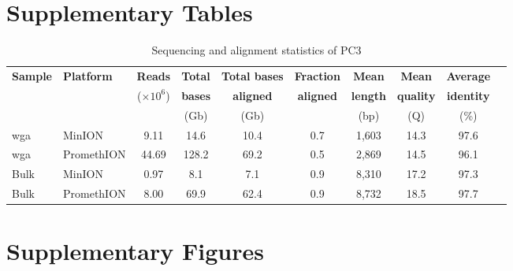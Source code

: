 \documentclass[pdflatex]{sn-jnl}%
\begin{document}
\clearpage

\section*{Supplementary Tables}

\begin{table}[!ht]
	\centering
	\caption{Sequencing and alignment statistics of PC3}
	\label{tab:seq_stats}
	\small
	\setlength{\tabcolsep}{3pt} %
	\begin{tabular}{@{}llcccccccc@{}}
		\toprule
		\textbf{Sample} & \textbf{Platform} & \textbf{Reads}  & \textbf{Total} & \textbf{Total bases} & \textbf{Fraction} & \textbf{Mean}   & \textbf{Mean}    & \textbf{Average}  \\
		                &                   & ($\times 10^6$) & \textbf{bases} & \textbf{aligned}     & \textbf{aligned}  & \textbf{length} & \textbf{quality} & \textbf{identity} \\
		                &                   &                 & (Gb)           & (Gb)                 &                   & (bp)            & (Q)              & (\%)              \\
		\midrule
		\gls{wga}       & MinION            & 9.11            & 14.6           & 10.4                 & 0.7               & 1,603           & 14.3             & 97.6              \\
		\gls{wga}       & PromethION        & 44.69           & 128.2          & 69.2                 & 0.5               & 2,869           & 14.5             & 96.1              \\
		Bulk            & MinION            & 0.97            & 8.1            & 7.1                  & 0.9               & 8,310           & 17.2             & 97.3              \\
		Bulk            & PromethION        & 8.00            & 69.9           & 62.4                 & 0.9               & 8,732           & 18.5             & 97.7              \\
		\bottomrule
	\end{tabular}
\end{table}

\clearpage

\section*{Supplementary Figures}
\end{document}
